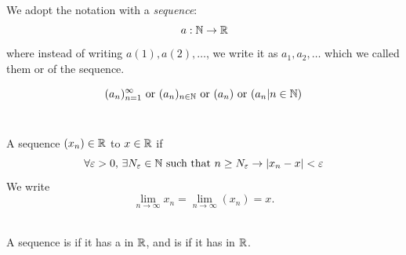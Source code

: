 \documentclass[a4paper,12pt]{article}
\begin{document}
We adopt the notation with a \textit{sequence}:
\[\,a:\mathbb{N}\rightarrow\mathbb{R}\]
where instead of writing \(a(1), a(2), \dots\), we write it as \(a_1, a_2, \dots\) which we called them 
 or  of the sequence.\\

\begin{notation}

\[(a_n)_{n=1}^\infty  \text{ or }  (a_n)_{n\in\mathbb{N}}  \text{ or }  (a_n)  \text{ or }  (a_n|n\in \mathbb{N})\]\\
\end{notation}

\begin{definition}
    A sequence \((x_n)\in\mathbb{R}\)  to \(x\in\mathbb{R}\) if 
    \[\forall \varepsilon >0,\, \exists N_\varepsilon \in \mathbb{N} \text{ such that }n\ge N_\varepsilon \rightarrow\left\lvert x_n - x\right\rvert <\varepsilon\]
    We write \[\lim_{n\to\infty}x_n = \lim_{n\to\infty}(x_n) = x.\]\\
\end{definition}

\begin{definition}
    A sequence is  if it has a  in \(\mathbb{R}\), and is  if it 
    has  in $\mathbb{R}$.\\
\end{definition}
\end{document}
